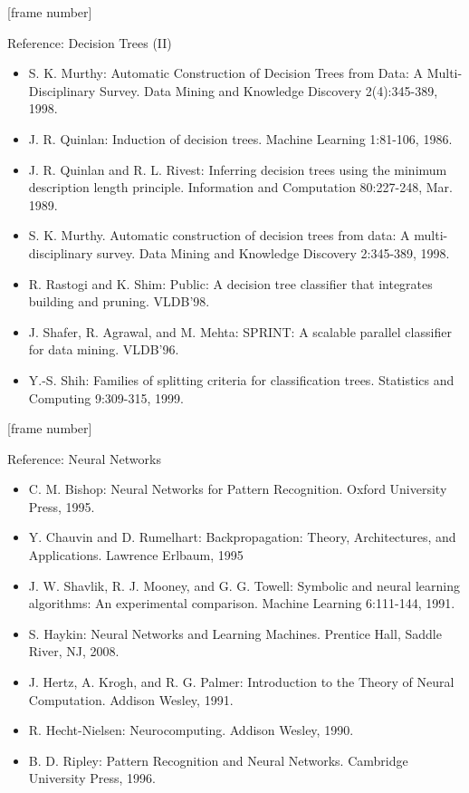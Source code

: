 \documentclass[aspectratio=169,t,table]{beamer}
\begin{document}
  {
    [frame number]
    \begin{frame}{Reference: Decision Trees (II)}
      \begin{itemize}
        \item S. K. Murthy: Automatic Construction of Decision Trees from Data: A Multi-Disciplinary Survey. Data Mining and Knowledge Discovery 2(4):345-389, 1998.
        \item J. R. Quinlan: Induction of decision trees. Machine Learning 1:81-106, 1986.
        \item J. R. Quinlan and R. L. Rivest: Inferring decision trees using the minimum description length principle. Information and Computation 80:227-248, Mar. 1989.
        \item S. K. Murthy. Automatic construction of decision trees from data: A multi-disciplinary survey. Data Mining and Knowledge Discovery 2:345-389, 1998.
        \item R. Rastogi and K. Shim: Public: A decision tree classifier that integrates building and pruning. VLDB'98.
        \item J. Shafer, R. Agrawal, and M. Mehta: SPRINT: A scalable parallel classifier for data mining. VLDB'96.
        \item Y.-S. Shih: Families of splitting criteria for classification trees. Statistics and Computing 9:309-315, 1999.
      \end{itemize}
    \end{frame}
  }

  {
    [frame number]
    \begin{frame}{Reference: Neural Networks}
      \begin{itemize}
        \item C. M. Bishop: Neural Networks for Pattern Recognition. Oxford University Press, 1995.
        \item Y. Chauvin and D. Rumelhart: Backpropagation: Theory, Architectures, and Applications. Lawrence Erlbaum, 1995
        \item J. W. Shavlik, R. J. Mooney, and G. G. Towell: Symbolic and neural learning algorithms: An experimental comparison. Machine Learning 6:111-144, 1991.
        \item S. Haykin: Neural Networks and Learning Machines. Prentice Hall, Saddle River, NJ, 2008.
        \item J. Hertz, A. Krogh, and R. G. Palmer: Introduction to the Theory of Neural Computation. Addison Wesley, 1991.
        \item R. Hecht-Nielsen: Neurocomputing. Addison Wesley, 1990.
        \item B. D. Ripley: Pattern Recognition and Neural Networks. Cambridge University Press, 1996.
      \end{itemize}
    \end{frame}
  }
\end{document}
